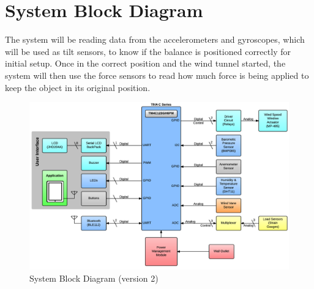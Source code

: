 \section{System Block Diagram}


	The system will be reading data from the accelerometers and gyroscopes, which will be used as tilt sensors, to know if the balance is positioned correctly for initial setup. Once in the correct position and the wind tunnel started, the system will then use the force sensors to read how much force is being applied to keep the object in its original position. 

	\begin{figure}[H]
		\centering
			\includegraphics[scale=0.30]{img/blockdiagramv2}
		\caption{System Block Diagram (version 2)}
	\end{figure}